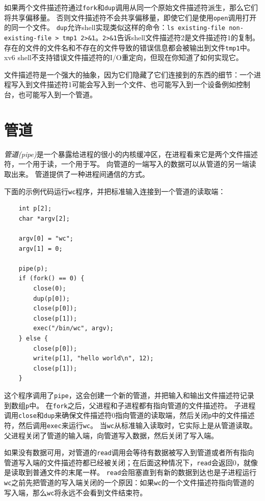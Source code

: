 如果两个文件描述符通过\texttt{fork}和\texttt{dup}调用从同一个原始文件描述符派生，那么它们将共享偏移量。
否则文件描述符不会共享偏移量，即使它们是使用\texttt{open}调用打开的同一个文件。
\texttt{dup}允许shell实现类似这样的命令：\texttt{ls existing-file non-existing-file > tmp1 2>\&1}。\texttt{2>\&1}告诉shell文件描述符2是文件描述符1的复制。
存在的文件的文件名和不存在的文件导致的错误信息都会被输出到文件\texttt{tmp1}中。
xv6 shell不支持错误文件描述符的I/O重定向，但现在你知道了如何实现它。

文件描述符是一个强大的抽象，因为它们隐藏了它们连接到的东西的细节：一个进程写入到文件描述符1可能会写入到一个文件、也可能写入到一个设备例如控制台，也可能写入到一个管道。

\section{管道}
\emph{管道(pipe)}是一个暴露给进程的很小的内核缓冲区，在进程看来它是两个文件描述符，一个用于读，一个用于写。
向管道的一端写入的数据可以从管道的另一端读取出来。
管道提供了一种进程间通信的方式。

下面的示例代码运行\texttt{wc}程序，并把标准输入连接到一个管道的读取端：
\begin{lstlisting}
    int p[2];
    char *argv[2];

    argv[0] = "wc";
    argv[1] = 0;

    pipe(p);
    if (fork() == 0) {
        close(0);
        dup(p[0]);
        close(p[0]);
        close(p[1]);
        exec("/bin/wc", argv);
    } else {
        close(p[0]);
        write(p[1], "hello world\n", 12);
        close(p[1]);
    }
\end{lstlisting}

这个程序调用了\texttt{pipe}，这会创建一个新的管道，并把输入和输出文件描述符记录到数组\texttt{p}中。
在\texttt{fork}之后，父进程和子进程都有指向管道的文件描述符。
子进程调用\texttt{close}和\texttt{dup}来确保文件描述符0指向管道的读取端，然后关闭\texttt{p}中的文件描述符，然后调用\texttt{exec}来运行\texttt{wc}。
当\texttt{wc}从标准输入读取时，它实际上是从管道读取。
父进程关闭了管道的输入端，向管道写入数据，然后关闭了写入端。

如果没有数据可用，对管道的\texttt{read}调用会等待有数据被写入到管道或者所有指向管道写入端的文件描述符都已经被关闭；在后面这种情况下，\texttt{read}会返回0，就像是读取到普通文件的末尾一样。
\texttt{read}会阻塞直到有新的数据到达也是子进程运行\texttt{wc}之前先把管道的写入端关闭的一个原因：如果\texttt{wc}的一个文件描述符指向管道的写入端，那么\texttt{wc}将永远不会看到文件结束符。

